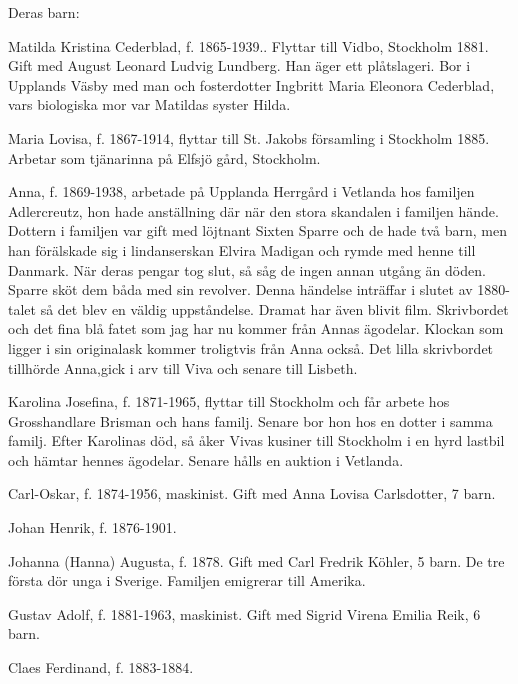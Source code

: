 Deras barn:


Matilda Kristina Cederblad, f. 1865-1939.. Flyttar till Vidbo, Stockholm 1881. Gift med August Leonard Ludvig Lundberg. Han äger ett plåtslageri. Bor i Upplands Väsby med man och fosterdotter Ingbritt Maria Eleonora Cederblad, vars biologiska mor var Matildas syster Hilda.


Maria Lovisa, f. 1867-1914, flyttar till St. Jakobs församling i Stockholm 1885. Arbetar som tjänarinna på Elfsjö gård, Stockholm.


Anna, f. 1869-1938, arbetade på Upplanda Herrgård i Vetlanda hos familjen Adlercreutz, hon hade anställning där när den stora skandalen i familjen hände. Dottern i familjen var gift med löjtnant Sixten Sparre och de hade två barn, men han förälskade sig i  lindanserskan Elvira Madigan och rymde med henne till Danmark. När deras pengar tog slut, så såg de ingen annan utgång än döden. Sparre sköt dem båda med sin revolver. Denna händelse inträffar i slutet av 1880-talet så det blev en väldig uppståndelse. Dramat har även blivit film. Skrivbordet och det fina blå fatet som jag har nu  kommer från Annas ägodelar. Klockan som ligger i sin originalask kommer troligtvis från Anna också. Det lilla skrivbordet tillhörde Anna,gick i arv till Viva och senare till Lisbeth.




Karolina Josefina, f. 1871-1965, flyttar till Stockholm och får arbete hos Grosshandlare Brisman och hans familj. Senare bor hon hos en dotter i samma familj.
Efter Karolinas död, så åker Vivas kusiner till Stockholm i en hyrd lastbil och hämtar hennes ägodelar. Senare hålls en auktion i Vetlanda.


Carl-Oskar, f. 1874-1956, maskinist. Gift med Anna Lovisa Carlsdotter, 7 barn.


Johan Henrik, f. 1876-1901.


Johanna (Hanna) Augusta, f. 1878. Gift med Carl Fredrik Köhler, 5 barn. De tre första dör unga i Sverige. Familjen emigrerar till Amerika.


Gustav Adolf, f. 1881-1963, maskinist. Gift med Sigrid Virena Emilia Reik, 6 barn.


Claes Ferdinand, f. 1883-1884.


